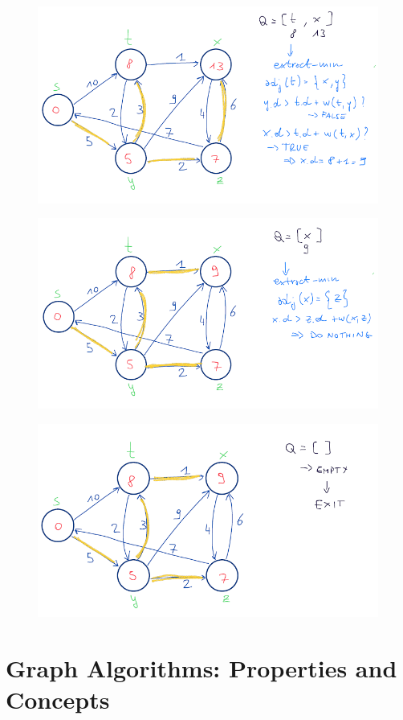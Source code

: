 \begin{figure}[H]
    \centering
\includegraphics[width=0.75\linewidth]{dij ex 4.png}

\end{figure}
\begin{figure}[H]
    \centering
\includegraphics[width=0.75\linewidth]{dij ex 5.png}

\end{figure}
\begin{figure}[H]
    \centering
\includegraphics[width=0.75\linewidth]{dij ex 6.png}

\end{figure}



\section{Graph Algorithms: Properties and Concepts}


